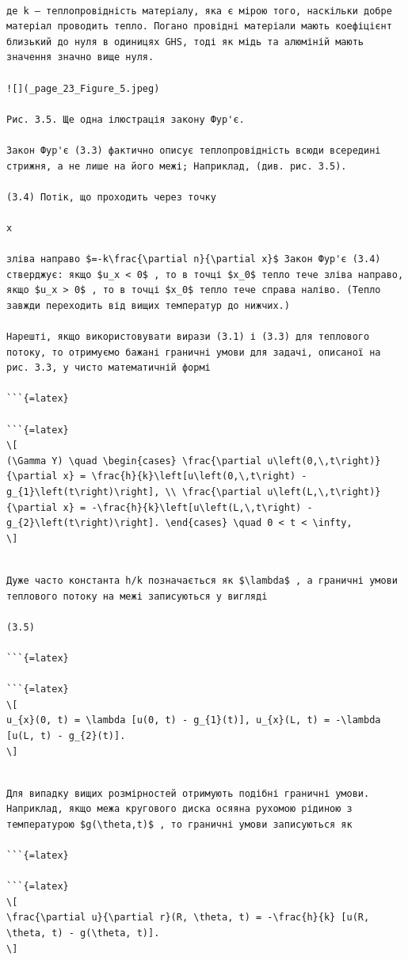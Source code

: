 \documentclass[
]{article}
\begin{document}
\begin{verbatim}

де k — теплопровідність матеріалу, яка є мірою того, наскільки добре матеріал проводить тепло. Погано провідні матеріали мають коефіцієнт близький до нуля в одиницях GHS, тоді як мідь та алюміній мають значення значно вище нуля.

![](_page_23_Figure_5.jpeg)

Рис. 3.5. Ще одна ілюстрація закону Фур'є.

Закон Фур'є (3.3) фактично описує теплопровідність всюди всередині стрижня, а не лише на його межі; Наприклад, (див. рис. 3.5).

(3.4) Потік, що проходить через точку

x

зліва направо $=-k\frac{\partial n}{\partial x}$ Закон Фур'є (3.4) стверджує: якщо $u_x < 0$ , то в точці $x_0$ тепло тече зліва направо, якщо $u_x > 0$ , то в точці $x_0$ тепло тече справа наліво. (Тепло завжди переходить від вищих температур до нижчих.)

Нарешті, якщо використовувати вирази (3.1) і (3.3) для теплового потоку, то отримуємо бажані граничні умови для задачі, описаної на рис. 3.3, у чисто математичній формі

```{=latex}

```{=latex}
\[
(\Gamma Y) \quad \begin{cases} \frac{\partial u\left(0,\,t\right)}{\partial x} = \frac{h}{k}\left[u\left(0,\,t\right) - g_{1}\left(t\right)\right], \\ \frac{\partial u\left(L,\,t\right)}{\partial x} = -\frac{h}{k}\left[u\left(L,\,t\right) - g_{2}\left(t\right)\right]. \end{cases} \quad 0 < t < \infty,
\]
\end{verbatim}

\begin{verbatim}

Дуже часто константа h/k позначається як $\lambda$ , а граничні умови теплового потоку на межі записуються у вигляді

(3.5)

```{=latex}

```{=latex}
\[
u_{x}(0, t) = \lambda [u(0, t) - g_{1}(t)], u_{x}(L, t) = -\lambda [u(L, t) - g_{2}(t)].
\]
\end{verbatim}

\begin{verbatim}

Для випадку вищих розмірностей отримують подібні граничні умови. Наприклад, якщо межа кругового диска осяяна рухомою рідиною з температурою $g(\theta,t)$ , то граничні умови записуються як

```{=latex}

```{=latex}
\[
\frac{\partial u}{\partial r}(R, \theta, t) = -\frac{h}{k} [u(R, \theta, t) - g(\theta, t)].
\]
\end{verbatim}
\end{document}
